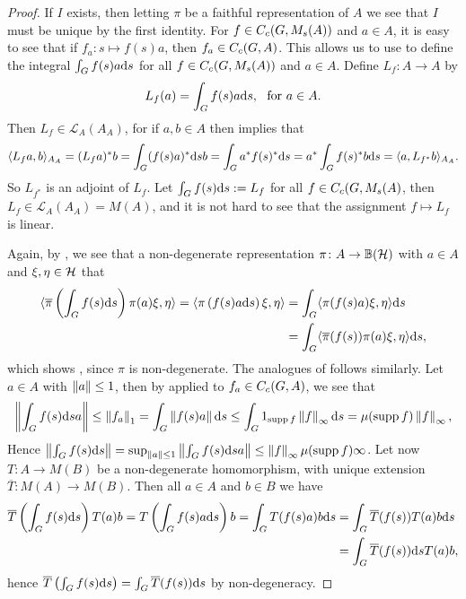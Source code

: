 \begin{proof}
If $I$ exists, then letting $\pi$ be a faithful representation of $A$ we see that $I$ must be unique by the first identity. For  $f \in C_c(G,M_s(A))$ and $a \in A$, it is easy to see that if $f_a \colon s \mapsto f(s) a$, then $f_a \in C_c(G,A)$. This allows us to use  to define the integral $\int_G f(s) a \mathrm{d} s$ for all $f \in C_c(G,M_s(A))$ and $a \in A$. Define $L_f \colon A \to A$ by
\begin{align*}
	L_f(a) = \int_G f(s) a \mathrm{d} s, \ \text{ for } a \in A.
\end{align*}
Then $L_f \in \mathcal{L}_A(A_A)$, for if $a,b \in A$ then  implies that
\begin{align*}
	\langle L_f a , b \rangle_{A_A} = (L_f a )^* b = \int_G (f(s) a)^* \mathrm{d} s b = \int_G a^* f(s)^* \mathrm{d} s = a^* \int_G f(s)^* b \mathrm{d} s = \langle a , L_{f^*} b\rangle_{A_A}.
\end{align*}
So $L_{f^*}$ is an adjoint of $L_f$. Let $\int_G f(s) \mathrm{d} s := L_f$ for all $f \in C_c(G,M_s(A)$, then $L_f \in \mathcal{L}_A(A_A) = M(A)$, and it is not hard to see that the assignment $f \mapsto L_f$ is linear.

Again, by , we see that a non-degenerate representation $\pi \colon A \to \mathbb{B}(\mathcal{H})$ with $a \in A$ and $\xi, \eta \in \mathcal{H}$ that
\begin{align*}
	\langle \overline \pi \left( \int_G f(s) \mathrm{d} s \right) \pi(a) \xi , \eta \rangle =\langle \pi \left(f(s) a \mathrm{d} s \right) \xi , \eta \rangle &= \int_G \langle \pi(f(s) a) \xi , \eta \rangle \mathrm{d} s\\
	&= \int_G \langle \overline \pi (f(s)) \pi(a) \xi , \eta \rangle \mathrm{d} s,
\end{align*}
which shows , since $\pi$ is non-degenerate. The analogues of  follows similarly. Let $a \in A$ with $\left\lVert a \right\rVert \leq 1$, then by  applied to $f_a \in C_c(G,A)$, we see that
\begin{align*}
	\left\lVert \int_G f(s) \mathrm{d} s a \right\rVert  \leq \left\lVert f_a \right\rVert_1 = \int_G \left\lVert f(s) a \right\rVert \mathrm{d} s \leq \int_G 1_{\operatorname{supp} f} \left\lVert f \right\rVert_{\infty} \mathrm{d} s = \mu(\operatorname{supp} f) \left\lVert f \right\rVert_{\infty},
\end{align*}
Hence $\left\lVert \int_G f(s) \mathrm{d} s \right\rVert = \sup_{\left\lVert a \right\rVert \leq 1} \left\lVert \int_G f(s) \mathrm{d} s a\right\rVert \leq \left\lVert f \right\rVert_{\infty} \mu(\operatorname{supp} f)\infty$. Let now $T \colon A \to M(B)$ be a non-degenerate homomorphism, with unique extension $\overline T \colon M(A) \to M(B)$. Then all $ a \in A$ and $b \in B$ we have
\begin{align*}
	\overline T\left(  \int_G f(s) \mathrm{d} s \right) T(a) b = T\left( \int_G f(s) a \mathrm{d} s  \right)b= \int_{G} T(f(s)a ) b \mathrm{d} s &= \int_G \overline T(f(s)) T(a)b \mathrm{d} s \\
	&=\int_G \overline T(f(s)) \mathrm{d} s T(a)b,
\end{align*}
hence $\overline T \left( \int_G f(s) \mathrm{d} s \right) = \int_G \overline T(f(s)) \mathrm{d} s$ by non-degeneracy.
\end{proof}
